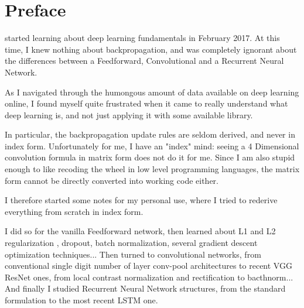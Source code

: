\chapter{Preface}

 started learning about deep learning fundamentals in February 2017. At this time, I knew nothing about backpropagation, and was completely ignorant about the differences between a Feedforward, Convolutional and a Recurrent Neural Network.

\vspace{0.2cm}

As I navigated through the humongous amount of data available on deep learning online, I found myself quite frustrated when it came to really understand what deep learning is, and not just applying it with some available library.

\vspace{0.2cm}

In particular, the backpropagation update rules are seldom derived, and never in index form. Unfortunately for me, I have an "index" mind: seeing a 4 Dimensional convolution formula in matrix form does not do it for me. Since I am also stupid enough to like recoding the wheel in low level programming languages, the matrix form cannot be directly converted into working code either.


\vspace{0.2cm}

I therefore started some notes for my personal use, where I tried to rederive everything from scratch in index form.

\vspace{0.2cm}

I did so for the vanilla Feedforward network, then learned about L1 and L2 regularization , dropout\cite{Srivastava:2014:DSW:2627435.2670313}, batch normalization\cite{Ioffe2015}, several gradient descent optimization techniques... Then turned to convolutional networks, from conventional single digit number of layer conv-pool architectures\cite{Lecun98gradient-basedlearning} to recent VGG\cite{DBLP:journals/corr/SimonyanZ14a} ResNet\cite{He2015} ones, from local contrast normalization and rectification to bacthnorm... And finally I studied Recurrent Neural Network structures\cite{GravesA2016}, from the standard formulation to the most recent LSTM one\cite{Gers:2000:LFC:1121912.1121915}.

\vspace{0.2cm}

